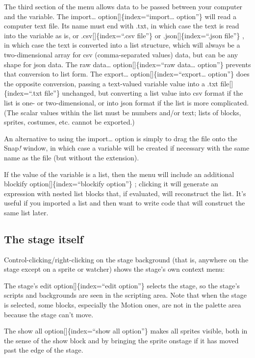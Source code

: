 \documentclass[
  letterpaper,
]{book}
\begin{document}
The third section of the menu allows data to be passed between your
computer and the variable. The import\ldots{}
option{[}{]}\{index=``import\ldots{} option''\} will read a computer
text file. Its name must end with .txt, in which case the text is read
into the variable as is, or .csv{[}{]}\{index=``.csv file''\} or
.json{[}{]}\{index=``.json file''\} , in which case the text is
converted into a list structure, which will always be a two-dimensional
array for csv (comma-separated values) data, but can be any shape for
json data. The raw data\ldots{} option{[}{]}\{index=``raw data\ldots{}
option''\} prevents that conversion to list form. The export\ldots{}
option{[}{]}\{index=``export\ldots{} option''\} does the opposite
conversion, passing a text-valued variable value into a .txt
file{[}{]}\{index=``.txt file''\} unchanged, but converting a list value
into csv format if the list is one- or two-dimensional, or into json
format if the list is more complicated. (The scalar values within the
list must be numbers and/or text; lists of blocks, sprites, costumes,
etc. cannot be exported.)

An alternative to using the import\ldots{} option is simply to drag the
file onto the Snap\emph{!} window, in which case a variable will be
created if necessary with the same name as the file (but without the
extension).

If the value of the variable is a list, then the menu will include an
additional blockify option{[}{]}\{index=``blockify option''\} ; clicking
it will generate an expression with nested list blocks that, if
evaluated, will reconstruct the list. It's useful if you imported a list
and then want to write code that will construct the same list later.

\subsection{The stage itself}\label{the-stage-itself}

Control-clicking/right-clicking on the stage background (that is,
anywhere on the stage except on a sprite or watcher) shows the stage's
own context menu:

The stage's edit option{[}{]}\{index=``edit option''\} selects the
stage, so the stage's scripts and backgrounds are seen in the scripting
area. Note that when the stage is selected, some blocks, especially the
Motion ones, are not in the palette area because the stage can't move.

The show all option{[}{]}\{index=``show all option''\} makes all sprites
visible, both in the sense of the show block and by bringing the sprite
onstage if it has moved past the edge of the stage.
\end{document}
